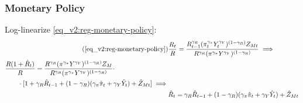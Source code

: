 \documentclass[../thesis.tex]{subfiles}
\begin{document}

\begin{comment}
	



\begin{tcolorbox}[colback=red!5!white,colframe=red!75!black]
	
	\subsubsection*{Capital and Labor Levels}
	
	Subtract \ref{eq_v2:reg-ll-int-good-firm-TMRS} of one region from the other:
	\begin{align}
		(\hat{K}_{1t} - \hat{L}_{1t}) - (\hat{K}_{2t} - \hat{L}_{2t}) &= (\hat{W}_{\eta t} - \hat{R}_{K t}) - (\hat{W}_{\eta t} - \hat{R}_{K t}) \implies \nonumber \\
		\hat{K}_{1t} - \hat{L}_{1t} &= \hat{K}_{2t} - \hat{L}_{2t} \label{eq_v2:reg-ll-int-good-firm-TMRS-b}
	\end{align}
	
\end{tcolorbox}


	
	
\end{comment}




\subsubsection*{Monetary Policy}

Log-linearize \ref{eq_v2:reg-monetary-policy}:
\begin{align}
	\tag{\ref{eq_v2:reg-monetary-policy}}
	& \frac{R_{t}}{R} = \frac{R_{t-1}^{\gamma_{R}} (\pi_t^{\gamma_{\pi}} Y_{t}^{\gamma_{Y}})^{(1-\gamma_{R})} Z_{Mt}}{R^{\gamma_{R}} (\pi^{\gamma_{\pi}} Y^{\gamma_{Y}})^{(1-\gamma_{R})}} \implies \\
	\begin{split}
		& \frac{R(1+ \hat{R}_t)}{R} = \frac{ R^{\gamma_{R}} (\pi^{\gamma_{\pi}} Y^{\gamma_{Y}})^{(1-\gamma_{R})} Z_{M}}{R^{\gamma_{R}} (\pi^{\gamma_{\pi}} Y^{\gamma_{Y}})^{(1-\gamma_{R})}} \cdot \\
		& \qquad \cdot [1+ \gamma_{R} \hat{R}_{t-1} + (1-\gamma_{R})(\gamma_{\pi} \hat{\pi}_t + \gamma_{Y} \hat{Y}_t) + \hat{Z}_{Mt}] \implies
	\end{split} \nonumber \\
	& \hat{R}_t = \gamma_{R} \hat{R}_{t-1} + (1-\gamma_{R})(\gamma_{\pi} \hat{\pi}_t + \gamma_{Y} \hat{Y}_t) + \hat{Z}_{Mt} \label{eq_v2:reg-ll-monetary-policy}
\end{align}
\end{document}
